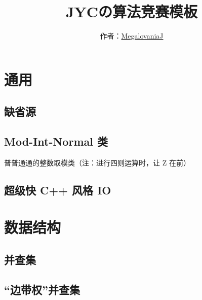 \documentclass[12pt]{article}
\begin{document}
\title{\vspace{-2cm}\textbf{\huge{JYCの算法竞赛模板}}}
\author{作者：\href{https://codeforces.com/profile/MegalovaniaJ}{MegalovaniaJ}}
\date{}
\maketitle

\tableofcontents

\newpage

{\centering\section{通用}}

\subsection{缺省源}



\newpage

\subsection{Mod-Int-Normal 类}

普普通通的整数取模类（注：进行四则运算时，让 Z 在前）



\newpage

\subsection{超级快 C++ 风格 IO}



\newpage

{\centering\section{数据结构}}

\subsection{并查集}



\newpage

\subsection{“边带权”并查集}
\end{document}
